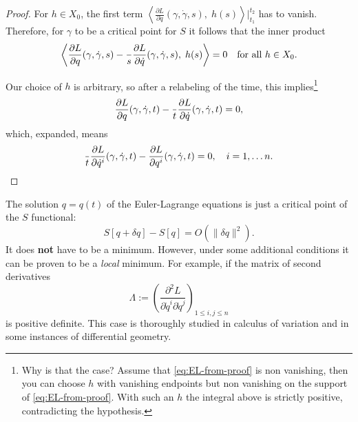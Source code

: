 \documentclass[english,fontsize=11pt,paper=a5,oneside]{scrbook}
\newcommand{\lag}{\langle}
\newcommand{\rag}{\rangle}
\let\d\relax
\newcommand{\d}{\mathrm{d}}
\theoremstyle{definition}
\newenvironment{remark}
  {\pushQED{\qed}\renewcommand{\qedsymbol}{$\lozenge$}\remarkx}
  {\popQED\endremarkx}
\begin{document}
\begin{proof}
  For $h\in X_0$, the first term $\left\lag\frac{\partial L}{\partial \dot q}(\gamma, \dot \gamma, s),\; h(s)\right\rag\Big|_{t_1}^{t_2}$ has to vanish. Therefore, for $\gamma$ to be a critical point for $S$ it follows that the inner product
  \begin{equation}
    \left\lag
    \frac{\partial L}{\partial q}(\gamma, \dot \gamma, s)
    - \frac{\d}{\d s}\frac{\partial L}{\partial \dot q}(\gamma, \dot \gamma, s)
    ,\; h(s)\right\rag = 0 \quad\mbox{for all } h\in X_0.
  \end{equation}

  Our choice of $h$ is arbitrary, so after a relabeling of the time, this implies\footnote{%
    Why is that the case? Assume that \eqref{eq:EL-from-proof} is non vanishing, then you can choose %
    $h$ with vanishing endpoints but non vanishing on the support of \eqref{eq:EL-from-proof}. %
    With such an $h$ the integral above is strictly positive, contradicting the hypothesis.}
  \begin{equation}\label{eq:EL-from-proof}
    \frac{\partial L}{\partial q}(\gamma, \dot \gamma, t)
    - \frac{\d}{\d t}\frac{\partial L}{\partial \dot q}(\gamma, \dot \gamma, t) = 0,
  \end{equation}
  which, expanded, means
  \begin{equation}
    \frac{\d}{\d t}\frac{\partial L}{\partial \dot q^i}(\gamma, \dot \gamma, t) - \frac{\partial L}{\partial q^i}(\gamma, \dot \gamma, t) = 0, \quad i=1,\ldots n.
  \end{equation}
\end{proof}

\begin{remark}
  The solution $q=q(t)$ of the Euler-Lagrange equations is just a critical point of the $S$ functional:
  \begin{equation}
    S[q + \delta q] - S[q] = O(\|\delta q\|^2).
  \end{equation}
  It does \textbf{not} have to be a minimum. However, under some additional conditions it can be proven to be a \emph{local} minimum.
  For example, if the matrix of second derivatives
  \begin{equation}\label{eq:hsd}
    \Lambda := \left(
    \frac{\partial^2 L}{\partial\dot q^i \partial\dot q^j}
    \right)_{1\leq i,j\leq n}
  \end{equation}
  is positive definite.
  This case is thoroughly studied in calculus of variation and in some instances of differential geometry.
\end{remark}
\end{document}
